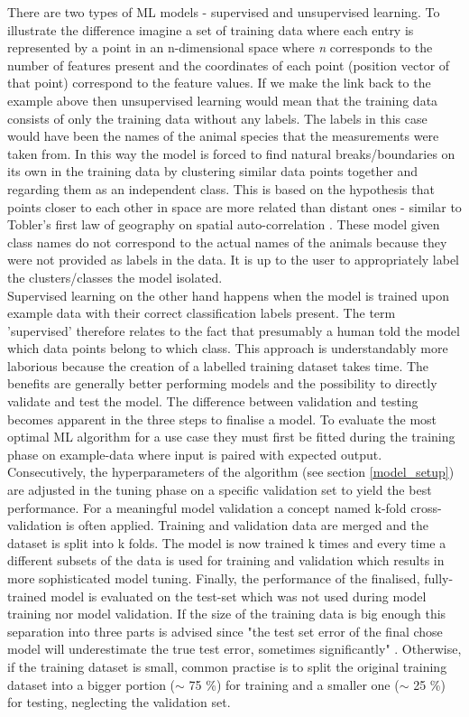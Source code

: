 There are two types of ML models - supervised and unsupervised learning. To illustrate the difference imagine a set of training data where each entry is represented by a point in an n-dimensional space where \textit{n} corresponds to the number of features present and the coordinates of each point (position vector of that point) correspond to the feature values. If we make the link back to the example above then unsupervised learning would mean that the training data consists of only the training data without any labels. The labels in this case would have been the names of the animal species that the measurements were taken from. In this way the model is forced to find natural breaks/boundaries on its own in the training data by clustering similar data points together and regarding them as an independent class. This is based on the hypothesis that points closer to each other in space are more related than distant ones - similar to Tobler's first law of geography on spatial auto-correlation \parencite{Tobler1970}. These model given class names do not correspond to the actual names of the animals because they were not provided as labels in the data. It is up to the user to appropriately label the clusters/classes the model isolated. \\

Supervised learning on the other hand happens when the model is trained upon example data with their correct classification labels present. The term 'supervised' therefore relates to the fact that presumably a human told the model which data points belong to which class. This approach is understandably more laborious because the creation of a labelled training dataset takes time. The benefits are generally better performing models and the possibility to directly validate and test the model. The difference between validation and testing becomes apparent in the three steps to finalise a model. To evaluate the most optimal ML algorithm for a use case they must first be fitted during the training phase on example-data where input is paired with expected output. Consecutively, the hyperparameters of the algorithm (see section \ref{model_setup}) are adjusted in the tuning phase on a specific validation set to yield the best performance. For a meaningful model validation a concept named k-fold cross-validation is often applied. Training and validation data are merged and the dataset is split into k folds. The model is now trained k times and every time a different subsets of the data is used for training and validation which results in more sophisticated model tuning. Finally, the performance of the finalised, fully-trained model is evaluated on the test-set which was not used during model training nor model validation. If the size of the training data is big enough this separation into three parts is advised since "the test set error of the final chose model will underestimate the true test error, sometimes significantly" \parencite[p.222]{Hastie2017}. Otherwise, if the training dataset is small, common practise \parencite{Guido2016} is to split the original training dataset into a bigger portion ($\sim$ 75 \%) for training and a smaller one ($\sim$ 25 \%) for testing, neglecting the validation set.

